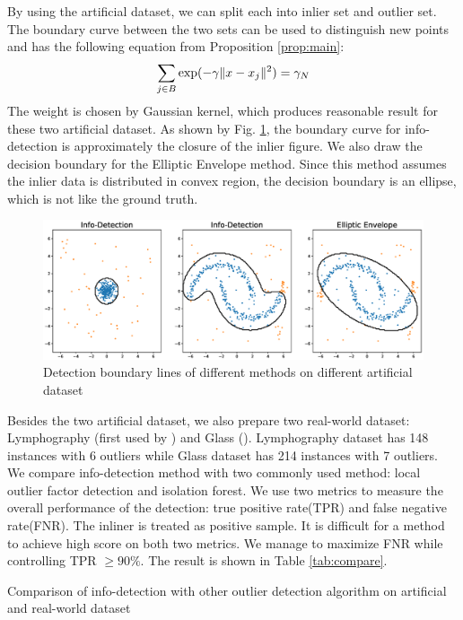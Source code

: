 \documentclass[runningheads]{llncs}
\begin{document}
By using the artificial dataset, we can split each into inlier set and outlier set. The boundary curve between the two sets can be used to distinguish new points and has the following equation from Proposition \ref{prop:main}:
\begin{equation}
\sum_{j \in B} \exp(-\gamma \lVert x - x_j\rVert^2)= \gamma_N
\end{equation}
The weight is chosen by Gaussian kernel, which produces reasonable result for these two artificial dataset. As shown by Fig. \ref{fig:boundary}, the boundary curve for info-detection is approximately the closure of the inlier figure. We also draw the decision boundary for the Elliptic Envelope method. Since this method assumes the inlier data is distributed in convex region, the decision boundary is an ellipse, which is not like the ground truth.
\begin{figure}[!ht]
	\centering
	\includegraphics[width=\textwidth]{pic/outlier_boundary_illustration.eps}
	\caption{Detection boundary lines of different methods on different artificial dataset}	\label{fig:boundary}
\end{figure}

Besides the two artificial dataset, we also prepare two real-world dataset: Lymphography (first used by \cite{Lazarevic}) and Glass (\cite{hics}). Lymphography dataset has 148 instances with 6 outliers while Glass dataset has 214 instances with 7 outliers. We compare info-detection method with two commonly used method: local outlier factor detection and isolation forest. We use two metrics to measure the overall performance of the detection: true positive rate(TPR) and false negative rate(FNR). The inliner is treated as positive sample. It is difficult for a method to achieve high score on both two metrics. We manage to maximize FNR while controlling TPR $\geq 90\%$. The result is shown in Table \ref{tab:compare}.
\begin{table}[!ht]
\centering
{}
\caption{Comparison of info-detection with other outlier detection algorithm on artificial and real-world dataset}\label{tab:compare}
\end{table}
\end{document}
